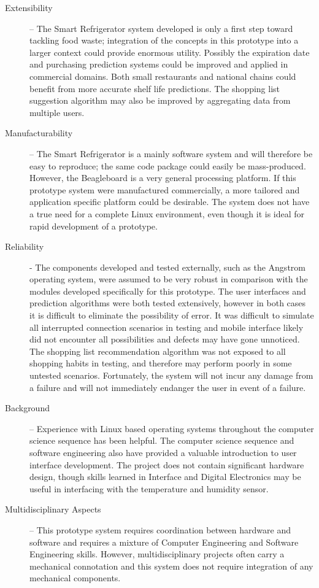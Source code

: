 \documentclass[11pt]{article} %
\begin{document}
\begin{description}
\item[Extensibility] -- The Smart Refrigerator system developed is only a first step toward tackling food waste; integration of the concepts in this prototype into a larger context could provide enormous utility. Possibly the expiration date and purchasing prediction systems could be improved and applied in commercial domains. Both small restaurants and national chains could benefit from more accurate shelf life predictions. The shopping list suggestion algorithm may also be improved by aggregating data from multiple users.
\item[Manufacturability] -- The Smart Refrigerator is a mainly software system and will therefore be easy to reproduce; the same code package could easily be mass-produced. However, the Beagleboard is a very general processing platform. If this prototype system were manufactured commercially, a more tailored and application specific platform could be desirable. The system does not have a true need for a  complete Linux environment, even though it is ideal for rapid development of a prototype.
\item[Reliability] - The components developed and tested externally, such as the Angstrom operating system, were assumed to be very robust in comparison with the modules developed specifically for this prototype. The user interfaces and prediction algorithms were both tested extensively, however in both cases it is difficult to eliminate the possibility of error. It was difficult to simulate all interrupted connection scenarios in testing and mobile interface likely did not encounter all possibilities and defects may have gone unnoticed. The shopping list recommendation algorithm was not exposed to all shopping habits in testing, and therefore may perform poorly in some untested scenarios. Fortunately, the system will not incur any damage from a failure and will not immediately endanger the user in event of a failure.
\item[Background] -- Experience with Linux based operating systems throughout the computer science sequence has been helpful. The computer science sequence and software engineering also have provided a valuable introduction to user interface development. The project does not contain significant hardware design, though skills learned in Interface and Digital Electronics may be useful in interfacing with the temperature and humidity sensor.
\item[Multidisciplinary Aspects] -- This prototype system requires coordination between hardware and software and requires a mixture of Computer Engineering and Software Engineering skills. However, multidisciplinary projects often carry a mechanical connotation and this system does not require integration of any mechanical components.
\end{description}
\end{document}
